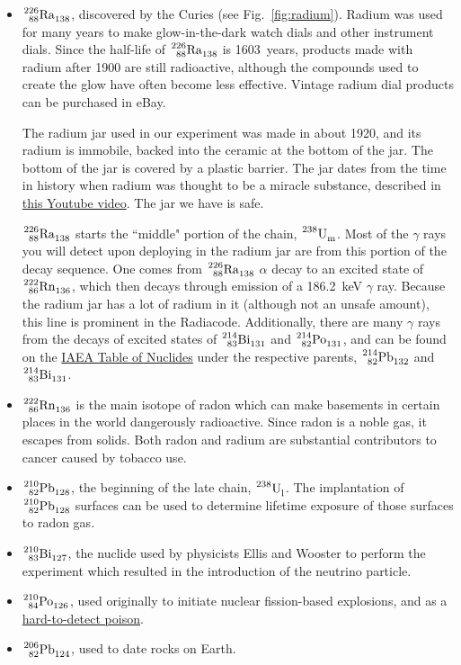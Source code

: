 \documentclass[12pt]{article}
\def\elem#1#2#3#4#5{{%
   \phantom{{}^{#2}_{#3}}%
   {\vphantom{\rm#1}}^{\llapscr{#2}}_{\llapscr{#3}}%
   {\rm#1}^{#4}_{#5}%
}}
\def\llapscr#1{\llap{$\scriptstyle#1$}}
\begin{document}
\begin{itemize}
    \item $\elem{Ra}{226}{88}{}{138}$, discovered by the Curies (see Fig.~\ref{fig:radium}).  Radium was used for many years to make glow-in-the-dark watch dials and other instrument dials.  Since the half-life of $\elem{Ra}{226}{88}{}{138}$ is 1603~years, products made with radium after 1900 are still radioactive, although the compounds used to create the glow have often become less effective.  Vintage radium dial products can be purchased in eBay. 
    
    The radium jar used in our experiment was made in about 1920, and its radium is immobile, backed into the ceramic at the bottom of the jar.  The bottom of the jar is covered by a plastic barrier.  The jar dates from the time in history when radium was thought to be a miracle substance, described in \href{https://youtu.be/83rd7eqxIHQ?si=QGlCiXy1jSI9tWp-}{this Youtube video}.  The jar we have is safe.
    
    $\elem{Ra}{226}{88}{}{138}$ starts the ``middle" portion of the chain, $\elem{U}{238}{}{}{\text{m}}$.  Most of the $\gamma$ rays you will detect upon deploying in the radium jar are from this portion of the decay sequence.
    One comes from $\elem{Ra}{226}{88}{}{138}$ $\alpha$ decay to an excited state of $\elem{Rn}{222}{86}{}{136}$, which then decays through emission of a 186.2~keV $\gamma$ ray.  Because the radium jar has a lot of radium in it (although not an unsafe amount), this line is prominent in the Radiacode.  Additionally, there are many $\gamma$ rays from the decays of excited states of $\elem{Bi}{214}{83}{}{131}$ and $\elem{Po}{214}{82}{}{131}$, and can be found on the \href{https://www-nds.iaea.org/relnsd/vcharthtml/VChartHTML.html#&showtype=2&lastnuc=208Tl&tabid=NR}{IAEA Table of Nuclides} under the respective parents, $\elem{Pb}{214}{82}{}{132}$ and $\elem{Bi}{214}{83}{}{131}$.
    
    \item $\elem{Rn}{222}{86}{}{136}$ is the main isotope of radon which can make basements in certain places in the world dangerously radioactive. Since radon is a noble gas, it escapes from solids.  Both radon and radium are substantial contributors to cancer caused by tobacco use.
    
    \item $\elem{Pb}{210}{82}{}{128}$, the beginning of the late chain, $\elem{U}{238}{}{}{\text{l}}$.  The implantation of $\elem{Pb}{210}{82}{}{128}$ surfaces can be used to determine lifetime exposure of those surfaces to radon gas.
    
     \item $\elem{Bi}{210}{83}{}{127}$, the nuclide used by physicists Ellis and Wooster to perform the experiment which resulted in the introduction of the neutrino particle.
     
     \item $\elem{Po}{210}{84}{}{126}$, used originally to initiate nuclear fission-based explosions, and as a \href{https://en.wikipedia.org/wiki/Alexander_Litvinenko}{hard-to-detect poison}.
      \item $\elem{Pb}{206}{82}{}{124}$, used to date rocks on Earth.
\end{itemize}
\end{document}
